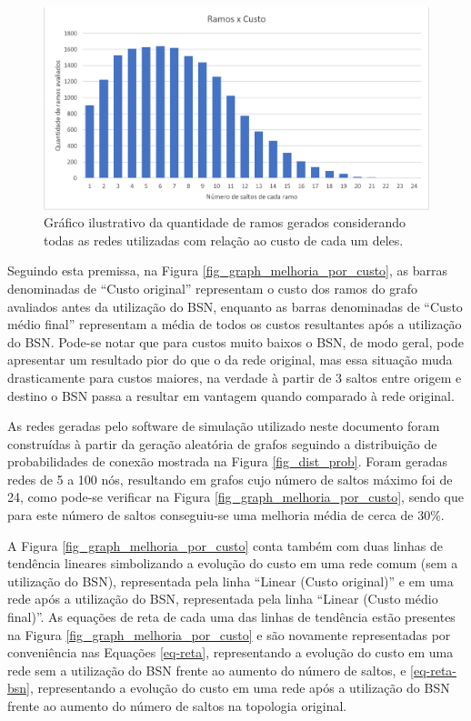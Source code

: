 \begin{figure} [ht]%
	\centering
	\includegraphics[width=1\textwidth]{./figuras/ramos-custo.png} %
	\caption[Ramos x Custo]{Gráfico ilustrativo da quantidade de ramos gerados considerando todas as redes utilizadas com relação ao custo de cada um deles.}
	\label{fig_graph_ramos_custo}
\end{figure}

Seguindo esta premissa, na Figura \ref{fig_graph_melhoria_por_custo}, as barras denominadas de ``Custo original'' representam o custo dos ramos do grafo avaliados antes da utilização do BSN, enquanto as barras denominadas de ``Custo médio final'' representam a média de todos os custos resultantes após a utilização do BSN. Pode-se notar que para custos muito baixos o BSN, de modo geral, pode apresentar um resultado pior do que o da rede original, mas essa situação muda drasticamente para custos maiores, na verdade à partir de 3 saltos entre origem e destino o BSN passa a resultar em vantagem quando comparado à rede original.

As redes geradas pelo software de simulação utilizado neste documento foram construídas à partir da geração aleatória de grafos seguindo a distribuição de probabilidades de conexão mostrada na Figura \ref{fig_dist_prob}. Foram geradas redes de 5 a 100 nós, resultando em grafos cujo número de saltos máximo foi de 24, como pode-se verificar na Figura \ref{fig_graph_melhoria_por_custo}, sendo que para este número de saltos conseguiu-se uma melhoria média de cerca de 30\%.

A Figura \ref{fig_graph_melhoria_por_custo} conta também com duas linhas de tendência lineares simbolizando a evolução do custo em uma rede comum (sem a utilização do BSN), representada pela linha ``Linear (Custo original)'' e em uma rede após a utilização do BSN, representada pela linha ``Linear (Custo médio final)''. As equações de reta de cada uma das linhas de tendência estão presentes na Figura \ref{fig_graph_melhoria_por_custo} e são novamente representadas por conveniência nas Equações \ref{eq-reta}, representando a evolução do custo em uma rede sem a utilização do BSN frente ao aumento do número de saltos, e \ref{eq-reta-bsn}, representando a evolução do custo em uma rede após a utilização do BSN frente ao aumento do número de saltos na topologia original.

